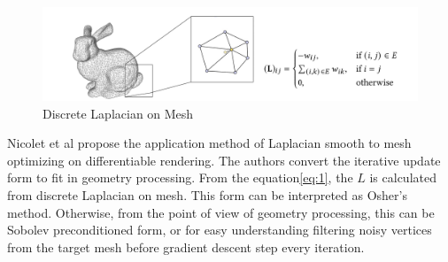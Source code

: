 \begin{figure}[!h]
    \includegraphics[width=\textwidth]{figures/related-work-1.png}
    \caption{Discrete Laplacian on Mesh}
    \label{fig:discreteLaplacian}
\end{figure}


Nicolet et al\cite{Nicolet2021Large} propose the application method of Laplacian smooth to mesh optimizing on differentiable rendering. The authors convert the iterative update form to fit in geometry processing.
From the equation\ref{eq:1}, the $L$ is calculated from discrete Laplacian on mesh. This form can be interpreted as Osher's method\cite{osher2018laplacian}. Otherwise, from the point of view of geometry processing, this can be Sobolev preconditioned form, or for easy understanding
filtering noisy vertices from the target mesh before gradient descent step every iteration.